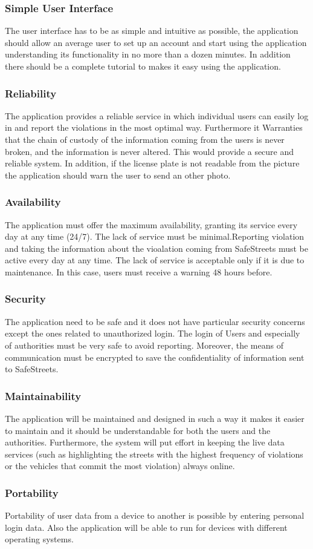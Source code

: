 \subsubsection{Simple User Interface}
The user interface has to be as simple and intuitive as possible, the application should allow an average user to set up an account and start using the application understanding its functionality in no more than a dozen minutes. In addition there should be a complete tutorial to makes it easy using the application.

\subsubsection{Reliability}
The application provides a reliable service in which individual users can easily log in and report the violations in the most optimal way. Furthermore it Warranties that the chain of custody of the information coming from the users is never broken, and the information is never altered. This would provide a secure and reliable system. In addition, if the license plate	is not readable from the picture the application should warn the user to send an other photo.
\subsubsection{Availability}
The application must offer the maximum availability, granting its service every day at any time (24/7). The lack of service must be minimal.Reporting violation and taking the information about the vioalation coming from SafeStreets must be active every day at any time. The lack of service is acceptable only if it is due to maintenance. In this case, users must receive a warning 48 hours before.
\subsubsection{Security}
The application need to be safe and it does not have particular security concerns except the ones related to unauthorized login. The login of Users and especially of authorities must be very safe to avoid reporting. Moreover, the means of communication must be encrypted to save the confidentiality of information sent to SafeStreets.
\subsubsection{Maintainability}
The application will be maintained and designed in such a way it makes it easier to maintain and it should be understandable for both the users and the authorities. Furthermore, the system will put eﬀort in keeping the live data services (such as highlighting the streets with the highest frequency of violations or the vehicles that commit the most violation) always online.
\subsubsection{Portability}
Portability of user data from a device to another is possible by entering personal login data. Also the application will be able to run for devices with different operating systems.

